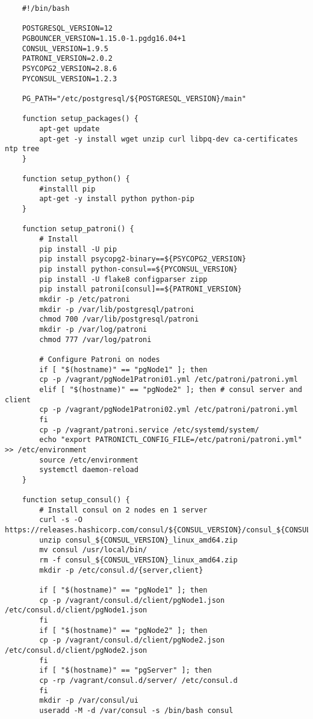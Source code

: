 \begin{lstlisting}  
    #!/bin/bash
    
    POSTGRESQL_VERSION=12
    PGBOUNCER_VERSION=1.15.0-1.pgdg16.04+1
    CONSUL_VERSION=1.9.5
    PATRONI_VERSION=2.0.2
    PSYCOPG2_VERSION=2.8.6
    PYCONSUL_VERSION=1.2.3
    
    PG_PATH="/etc/postgresql/${POSTGRESQL_VERSION}/main"
    
    function setup_packages() {
        apt-get update
        apt-get -y install wget unzip curl libpq-dev ca-certificates ntp tree
    }
    
    function setup_python() {
        #installl pip
        apt-get -y install python python-pip
    }
    
    function setup_patroni() {
        # Install
        pip install -U pip
        pip install psycopg2-binary==${PSYCOPG2_VERSION}
        pip install python-consul==${PYCONSUL_VERSION}
        pip install -U flake8 configparser zipp
        pip install patroni[consul]==${PATRONI_VERSION}
        mkdir -p /etc/patroni
        mkdir -p /var/lib/postgresql/patroni
        chmod 700 /var/lib/postgresql/patroni
        mkdir -p /var/log/patroni
        chmod 777 /var/log/patroni
        
        # Configure Patroni on nodes
        if [ "$(hostname)" == "pgNode1" ]; then
        cp -p /vagrant/pgNode1Patroni01.yml /etc/patroni/patroni.yml
        elif [ "$(hostname)" == "pgNode2" ]; then # consul server and client
        cp -p /vagrant/pgNode1Patroni02.yml /etc/patroni/patroni.yml
        fi
        cp -p /vagrant/patroni.service /etc/systemd/system/
        echo "export PATRONICTL_CONFIG_FILE=/etc/patroni/patroni.yml" >> /etc/environment
        source /etc/environment
        systemctl daemon-reload
    }
    
    function setup_consul() {
        # Install consul on 2 nodes en 1 server
        curl -s -O https://releases.hashicorp.com/consul/${CONSUL_VERSION}/consul_${CONSUL_VERSION}_linux_amd64.zip
        unzip consul_${CONSUL_VERSION}_linux_amd64.zip
        mv consul /usr/local/bin/
        rm -f consul_${CONSUL_VERSION}_linux_amd64.zip
        mkdir -p /etc/consul.d/{server,client}
        
        if [ "$(hostname)" == "pgNode1" ]; then
        cp -p /vagrant/consul.d/client/pgNode1.json /etc/consul.d/client/pgNode1.json
        fi
        if [ "$(hostname)" == "pgNode2" ]; then
        cp -p /vagrant/consul.d/client/pgNode2.json /etc/consul.d/client/pgNode2.json
        fi
        if [ "$(hostname)" == "pgServer" ]; then
        cp -rp /vagrant/consul.d/server/ /etc/consul.d
        fi
        mkdir -p /var/consul/ui
        useradd -M -d /var/consul -s /bin/bash consul
        

\end{lstlisting}
